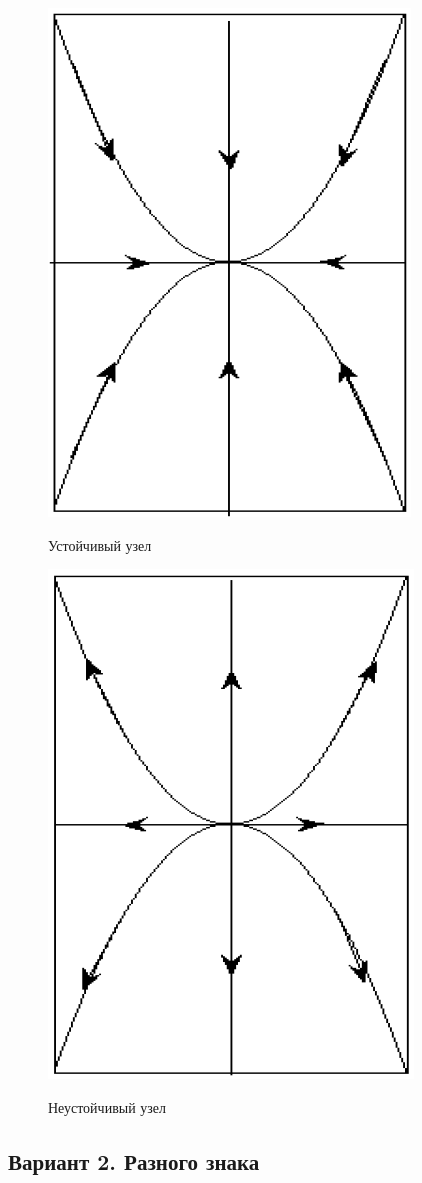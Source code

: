 	\begin{figure}[H]
		\centering
		\begin{minipage}[b]{0.49\linewidth}
			\centering
			\includegraphics[width=0.5\linewidth]{img/3_02}
			\par
			\small Устойчивый узел
		\end{minipage}
		\hfill
		\begin{minipage}[b]{0.49\linewidth}
			\centering
			\includegraphics[width=0.5\linewidth]{img/3_03}
			\par
			\small Неустойчивый узел
		\end{minipage}
	\end{figure}
	
	\begin{pinkbox}
		\subsection*{Вариант 2. Разного знака}
	\end{pinkbox}
	
